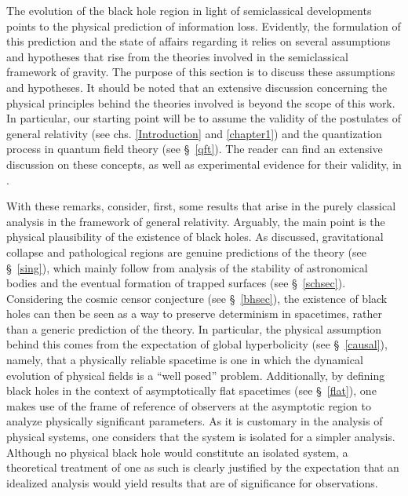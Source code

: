 \documentclass[
12pt,		%
openright,	%
twoside,  %
a4paper,			%
chapter=TITLE,		%
english,			%
french,				%
spanish,			%
brazil				%
]{USPSC-classe/USPSC}
\begin{document}
The evolution of the black hole region in light of semiclassical developments points to the physical prediction of information loss. Evidently, the formulation of this prediction and the state of affairs regarding it relies on several assumptions and hypotheses that rise from the theories involved in the semiclassical framework of gravity. The purpose of this section is to discuss these assumptions and hypotheses. It should be noted that an extensive discussion concerning the physical principles behind the theories involved is beyond the scope of this work. In particular, our starting point will be to assume the validity of the postulates of general relativity (see chs. \ref{Introduction} and \ref{chapter1}) and the quantization process in quantum field theory (see \S~\ref{qft}). The reader can find an extensive discussion on these concepts, as well as experimental evidence for their validity, in \cite{Will2014,Weinberg1995, Zee2023}.

With these remarks, consider, first, some results that arise in the purely classical analysis in the framework of general relativity. Arguably, the main point is the physical plausibility of the existence of black holes. As discussed, gravitational collapse and pathological regions are genuine predictions of the theory (see \S~\ref{sing}), which mainly follow from analysis of the stability of astronomical bodies and the eventual formation of trapped surfaces (see \S~\ref{schsec}). Considering the cosmic censor conjecture (see \S~\ref{bhsec}), the existence of black holes can then be seen as a way to preserve determinism in spacetimes, rather than a generic prediction of the theory. In particular, the physical assumption behind this comes from the expectation of global hyperbolicity (see \S~\ref{causal}), namely, that a physically reliable spacetime is one in which the dynamical evolution of physical fields is a ``well posed'' problem. Additionally, by defining black holes in the context of asymptotically flat spacetimes (see \S~\ref{flat}), one makes use of the frame of reference of observers at the asymptotic region to analyze physically significant parameters. As it is customary in the analysis of physical systems, one considers that the system is isolated for a simpler analysis. Although no physical black hole would constitute an isolated system, a theoretical treatment of one as such is clearly justified by the expectation that an idealized analysis would yield results that are of significance for observations.
\end{document}
